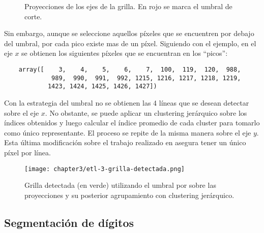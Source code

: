 \begin{figure}[H]
    \centering



    \caption{Proyecciones de los ejes de la grilla. En rojo se marca el umbral de corte.}
    \label{fig:etl-3-proyecciones}
\end{figure}

Sin embargo, aunque se seleccione aquellos píxeles que se encuentren por debajo del umbral, por cada pico existe mas de
un píxel. Siguiendo con el ejemplo, en el eje $x$ se obtienen los siguientes píxeles que se encuentran en los
``picos'':

\begin{verbatim}
    array([    3,    4,    5,    6,    7,  100,  119,  120,  988, 
             989,  990,  991,  992, 1215, 1216, 1217, 1218, 1219, 
            1423, 1424, 1425, 1426, 1427])
\end{verbatim}

Con la estrategia del umbral no se obtienen las 4 líneas que se desean detectar sobre el eje $x$. No obstante, se puede
aplicar un clustering jerárquico sobre los índices obtenidos y luego calcular el índice promedio de cada cluster para
tomarlo como único representante. El proceso se repite de la misma manera sobre el eje $y$. Esta última modificación
sobre el trabajo realizado en \parencite{lamagna2016lectura} asegura tener un único píxel por línea.

\begin{figure}[H]
    \centering
    \texttt{[image: chapter3/etl-3-grilla-detectada.png]}
    \caption{Grilla detectada (en verde) utilizando el umbral por sobre las proyecciones y su posterior agrupamiento con clustering jerárquico.}
    \label{fig:etl-3-grilla-detectada}
\end{figure}

\subsection{Segmentación de dígitos}

